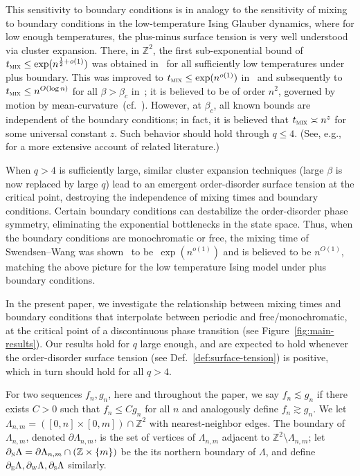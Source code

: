 \documentclass[reqno,11pt]{amsart}
\numberwithin{equation}{section}
\theoremstyle{definition}{
\newtheorem{example}[theorem]{Example}
\newtheorem{definition}[theorem]{Definition}
\newtheorem*{definition*}{Definition}
\newtheorem{problem}[theorem]{Problem}
\newtheorem{question}[theorem]{Question}
\newtheorem{remark}[theorem]{Remark}
}
\newcommand{\Z}{\mathbb Z}
\newcommand{\tmix}{t_{\textsc{mix}}}
\newcommand{\north}{{\textsc{n}}}
\newcommand{\south}{{\textsc{s}}}
\newcommand{\east}{{\textsc{e}}}
\newcommand{\west}{{\textsc{w}}}
\begin{document}
This sensitivity to boundary conditions is in analogy to the sensitivity of mixing to boundary conditions in the low-temperature Ising Glauber dynamics, where for low enough temperatures, the plus-minus surface tension is very well understood \cite{DKS} via cluster expansion. There, in $\mathbb Z^2$, the first sub-exponential bound of $\tmix \leq \exp(n^{\frac 12+o(1)})$ was obtained in~\cite{Martinelli94} for all sufficiently low temperatures under plus boundary. This was improved to $\tmix\leq \exp(n^{o(1)})$ in~\cite{MaTo10} and subsequently to $\tmix\leq n^{O(\log n)}$ for all $\beta>\beta_c$ in~\cite{LMST13}; it is believed to be of order $n^2$, governed by motion by mean-curvature~(cf.~\cite{FisherHuse87}).  However, at $\beta_c$, all known bounds are independent of the boundary conditions; in fact, it is believed that $\tmix \asymp n^{z}$ for some universal constant $z$. Such behavior should hold through $q\leq 4$. (See, e.g.,~\cite{GL16a,GL16b} for a more extensive account of related literature.)

When $q>4$ is sufficiently large, similar cluster expansion techniques (large $\beta$ is now replaced by large $q$) lead to an emergent order-disorder surface tension at the critical point, destroying the independence of mixing times and boundary conditions. Certain boundary conditions can destabilize the order-disorder phase symmetry, eliminating the exponential bottlenecks in the state space.
Thus, when the boundary conditions are monochromatic or free, the mixing time of Swendsen--Wang was shown~\cite{GL16a} to be~$\exp(n^{o(1)})$ and is believed to be $n^{O(1)}$, matching the above picture for the low temperature Ising model under plus boundary conditions.

In the present paper, we investigate the relationship between mixing times and boundary conditions that interpolate between periodic and free/monochromatic, at the critical point of a discontinuous phase transition (see Figure~\ref{fig:main-results}).
Our results hold for $q$ large enough, and are expected to hold whenever the order-disorder surface tension (see Def.~\ref{def:surface-tension}) is positive, which in turn should hold for all $q>4$.

For two sequences $f_n,g_n$, here and throughout the paper, we say $f_n \lesssim g_n$ if there exists $C>0$ such that $f_n \leq Cg_n$ for all $n$ and analogously define $f_n \gtrsim g_n$. We let $\Lambda_{n,m} = ([0,n]\times[0,m])\cap \mathbb Z^2$ with nearest-neighbor edges. The boundary of $\Lambda_{n,m}$, denoted $\partial \Lambda_{n,m}$, is the set of vertices of $\Lambda_{n,m}$ adjacent to $\mathbb Z^2 \setminus \Lambda_{n,m}$; let $\partial_{\north}\Lambda=\partial\Lambda_{n,m}\cap (\Z\times\{m\})$ be the its northern boundary of $\Lambda$, and define $\partial_{\east}\Lambda, \partial_\west \Lambda, \partial_\south \Lambda$ similarly.
\end{document}
